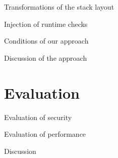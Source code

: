 \documentclass{beamer}
\begin{document}
\begin{frame}[c]{Transformations of the stack layout}
\end{frame}

\begin{frame}[c]{Injection of runtime checks}
\end{frame}

\begin{frame}[c]{Conditions of our approach}
\end{frame}

\begin{frame}[c]{Discussion of the approach}
\end{frame}

\section{Evaluation}
\label{sec:Implementation}

\begin{frame}[c]{Evaluation of security}
\end{frame}

\begin{frame}[c]{Evaluation of performance}
\end{frame}

\begin{frame}[c]{Discussion}
\end{frame}

 
\end{document}
